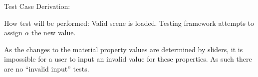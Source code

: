 \documentclass[12pt, titlepage]{article}
\begin{document}
\begin{enumerate}
	
	Test Case Derivation: 
	
	How test will be performed: Valid scene is loaded. Testing framework 
	attempts to assign $\alpha$ the new value. 

As the changes to the material property values are determined by sliders, it is 
impossible for a user to input an invalid value for these properties. As such 
there are no ``invalid input'' tests.
%	
%	
%	
%	
%	
%	
%	
%	
%	
%	
%	
%	
%	
%	
%	
%	
%	
%
%	
%	
%	
%	
%	


\end{enumerate}
\end{document}

